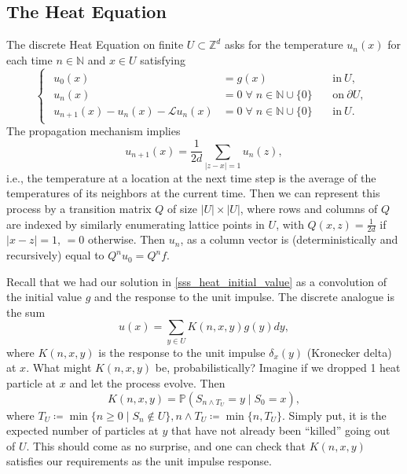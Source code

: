 \documentclass[openany, amssymb, psamsfonts]{amsart}
\theoremstyle{definition}
\numberwithin{equation}{section}
\newcommand{\bbn}{\mathbb{N}}
\newcommand{\bbz}{\mathbb{Z}}
\newcommand{\bbp}{\mathbb{P}}
\newcommand{\call}{\mathcal{L}}
\let\oldforall\forall
\renewcommand{\forall}{\;\oldforall\; }
\begin{document}
\subsection{The Heat Equation}
The discrete Heat Equation on finite $U \subset \bbz^d$ asks for the temperature $u_n(x)$ for each time $n \in \bbn$ and $x \in U$ satisfying
\begin{equation}
\begin{cases}
    \begin{aligned}
        u_0 (x) &= g(x) && \:\text{in}\: U ,\\
        u_n (x) &= 0 \forall n \in \bbn \cup \{0\} && \:\text{on}\: \partial U ,\\
        u_{n+1}(x) - u_n(x) - \call u_n(x) &= 0 \forall n \in \bbn \cup \{0\} && \:\text{in}\: U .
    \end{aligned}
\end{cases}
\end{equation}
The propagation mechanism implies
\begin{equation*}
    u_{n+1}(x) = \frac{1}{2d}\sum_{|z-x| = 1}u_n(z),
\end{equation*}
i.e., the temperature at a location at the next time step is the average of the temperatures of its neighbors at the current time. Then we can represent this process by a transition matrix $Q$ of size $|U| \times |U|$, where rows and columns of $Q$ are indexed by similarly enumerating  lattice points in $U$, with $Q(x, z) = \frac{1}{2d}$ if $|x-z| = 1$, $=0$ otherwise. Then $u_n$, as a column vector is (deterministically and recursively) equal to $Q^n u_0 = Q^n f$.

Recall that we had our solution in \autoref{sss_heat_initial_value} as a convolution of the initial value $g$ and the response to the unit impulse. The discrete analogue is the sum \begin{equation}
u(x) = \sum_{y \in U} K(n, x, y) g(y) dy,
\end{equation}
where $K(n, x, y)$ is the response to the unit impulse $\delta_x(y)$ (Kronecker delta) at $x$. What might $K(n, x, y)$ be, probabilistically? Imagine if we dropped 1 heat particle at $x$ and let the process evolve. Then \begin{equation*}
    K(n, x, y) = \bbp(S_{n \land T_U} = y \mid S_0 = x),
\end{equation*}
where $T_U \coloneqq \min\{n \geq 0 \mid S_n \not \in U\}, n \land T_U \coloneqq \min\{n, T_U\}$. Simply put, it is the expected number of particles at $y$ that have not already been ``killed'' going out of $U$. This should come as no surprise, and one can check that $K(n, x, y)$ satisfies our requirements as the unit impulse response.
\end{document}
